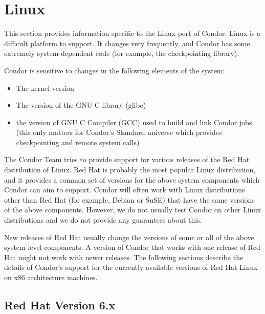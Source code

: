 \section{\label{sec:platform-linux}Linux}

This section provides information specific to the Linux port of
Condor.
Linux is a difficult platform to support.
It changes very frequently, and Condor has some extremely
system-dependent code (for example, the checkpointing library).

Condor is sensitive to changes in the following elements of the
system: 
\begin{itemize}
\item The kernel version
\item The version of the GNU C library (glibc)
\item the version of GNU C Compiler (GCC) used to build and link
  Condor jobs (this only matters for Condor's Standard universe which
  provides checkpointing and remote system calls)
\end{itemize}

The Condor Team tries to provide support for various releases of the
Red Hat distribution of Linux.
Red Hat is probably the most popular Linux distribution, and it
provides a common set of versions for the above system components
which Condor can aim to support.
Condor will often work with Linux distributions other than Red Hat (for
example, Debian or SuSE) that have the same versions of the above
components.
However, we do not usually test Condor on other Linux distributions
and we do not provide any guarantees about this.

New releases of Red Hat usually change the versions of some or all of
the above system-level components.
A version of Condor that works with one release of Red Hat might not
work with newer releases.
The following sections describe the details of Condor's support for
the currently available versions of Red Hat Linux on x86 architecture
machines.


\subsection{\label{sec:platform-linux-rh6}Red Hat Version 6.x}

